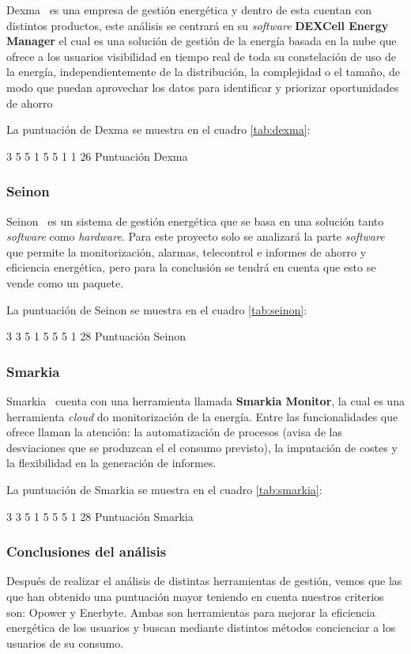 Dexma~\cite{dexma} es una empresa de gestión energética y dentro de esta cuentan con distintos productos, este análisis se centrará en su \textit{software} \textbf{DEXCell Energy Manager} el cual es una solución de gestión de la energía basada en la nube que ofrece a los usuarios visibilidad en tiempo real de toda su constelación de uso de la energía, independientemente de la distribución, la complejidad o el tamaño, de modo que puedan aprovechar los datos para identificar y priorizar oportunidades de ahorro

La puntuación de Dexma se muestra en el cuadro \ref{tab:dexma}:

\estatArt
{3}
{5}
{5}
{1}
{5}
{5}
{1}
{1}
{26}
{Puntuación Dexma \label{tab:dexma}}

\subsubsection{Seinon}

Seinon~\cite{seinon} es un sistema de gestión energética que se basa en una solución tanto \textit{software} como \textit{hardware}.
Para este proyecto solo se analizará la parte \textit{software} que permite la monitorización, alarmas, telecontrol e informes de ahorro y eficiencia energética, pero para la conclusión se tendrá en cuenta que esto se vende como un paquete.

La puntuación de Seinon se muestra en el cuadro \ref{tab:seinon}:

\estatArt
{3}
{3}
{5}
{1}
{5}
{5}
{5}
{1}
{28}
{Puntuación Seinon \label{tab:seinon}}

\subsubsection{Smarkia}

Smarkia~\cite{smarkia} cuenta con una herramienta llamada \textbf{Smarkia Monitor}, la cual es una herramienta \textit{cloud} do monitorización de la energía. Entre las funcionalidades que ofrece llaman la atención: la automatización de procesos (avisa de las desviaciones que se produzcan el el consumo previsto), la imputación de costes y la flexibilidad en la generación de informes.

La puntuación de Smarkia se muestra en el cuadro \ref{tab:smarkia}:

\estatArt
{3}
{3}
{5}
{1}
{5}
{5}
{5}
{1}
{28}
{Puntuación Smarkia \label{tab:smarkia}}

\subsubsection{Conclusiones del análisis}
Después de realizar el análisis de distintas herramientas de gestión, vemos que las que han obtenido una puntuación mayor teniendo en cuenta nuestros criterios son: Opower y Enerbyte. Ambas son herramientas para mejorar la eficiencia energética de los usuarios y buscan mediante distintos métodos concienciar a los usuarios de su consumo.

